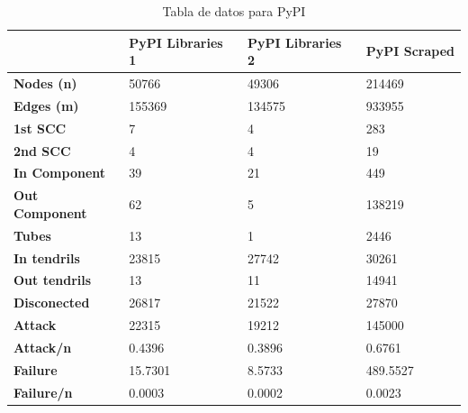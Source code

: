 \begin{table}[h!]
    \centering
    \tiny
    \label{tab:data_pypi}
    \begin{tabular}{|l|l|l|l|}
        \hline
                               & \textbf{PyPI Libraries 1} & \textbf{PyPI Libraries 2} & \textbf{PyPI Scraped} \\
        \hline
        \textbf{Nodes (n)}     & 50766                     & 49306                     & 214469                \\
        \textbf{Edges (m)}     & 155369                    & 134575                    & 933955                \\
        \textbf{1st SCC}       & 7                         & 4                         & 283                   \\
        \textbf{2nd SCC}       & 4                         & 4                         & 19                    \\
        \textbf{In Component}  & 39                        & 21                        & 449                   \\
        \textbf{Out Component} & 62                        & 5                         & 138219                \\
        \textbf{Tubes}         & 13                        & 1                         & 2446                  \\
        \textbf{In tendrils}   & 23815                     & 27742                     & 30261                 \\
        \textbf{Out tendrils}  & 13                        & 11                        & 14941                 \\
        \textbf{Disconected}   & 26817                     & 21522                     & 27870                 \\
        \textbf{Attack}        & 22315                     & 19212                     & 145000                \\
        \textbf{Attack/n}      & 0.4396                    & 0.3896                    & 0.6761                \\
        \textbf{Failure}       & 15.7301                   & 8.5733                    & 489.5527              \\
        \textbf{Failure/n}     & 0.0003                    & 0.0002                    & 0.0023                \\
        \hline
    \end{tabular}
    \caption{Tabla de datos para PyPI}
\end{table}

